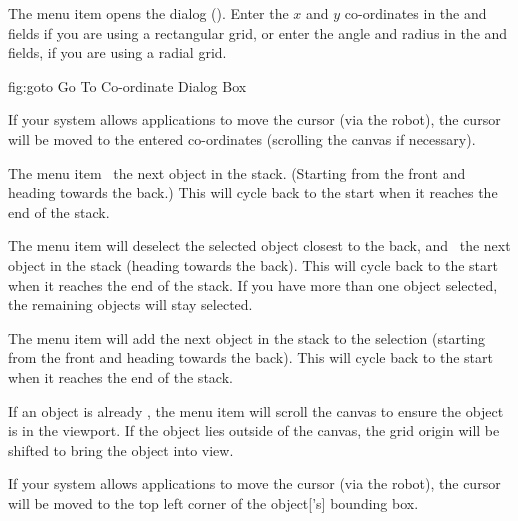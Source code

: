 The  menu item opens the
 dialog ().  Enter the
$x$ and $y$ co-ordinates in the  and
 fields if you are using a rectangular grid,
or enter the angle and radius in the  and
 fields, if you are using a radial grid.

\FloatFig
  {fig:goto}
  {}
  {Go To Co-ordinate Dialog Box}

If your system allows applications to move the cursor
(via the \gls{robot}), the cursor will be moved to the entered
co-ordinates (scrolling the \gls{canvas} if necessary).


The  menu item 
\selects\ the next \gls{object} in the \gls{stack}. (Starting from the
\gls{front} and heading towards the \gls{back}.) This will cycle back to
the start when it reaches the end of the \gls{stack}.


The  menu item will deselect the
selected \gls{object} closest to the \gls{back}, and \select\
the next \gls{object} in the \gls{stack} (heading towards the \gls{back}). This
will cycle back to the start when it reaches the end of the stack.
If you have more than one \gls{object} selected, the remaining
\glspl*{object} will stay selected.


The  menu item will add
the next \gls{object} in the \gls{stack} to the selection (starting from
the \gls{front} and heading towards the \gls{back}). This will cycle back to
the start when it reaches the end of the stack.


If an \gls{object} is already \selected, the 
menu item will scroll the \gls{canvas} to ensure the \gls{object} is
in the viewport.
If the \gls{object} lies outside of the \gls{canvas}, the grid
\gls{origin} will be shifted to bring the \gls{object} into view.

If your system allows applications to move the
cursor (via the \gls{robot}), the cursor will be moved to the top left corner of the
\gls{object}['s] bounding box.


